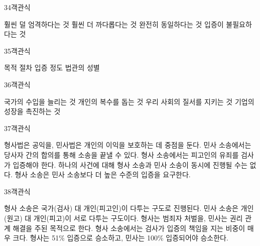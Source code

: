 \documentclass[fs9,seriesRus]{korfarm-base}
\begin{document}
\begin{kfQBlock}{34}{객관식}
\begin{kfChoices}
\kfChoice 훨씬 덜 엄격하다는 것
\kfChoice 훨씬 더 까다롭다는 것
\kfChoice 완전히 동일하다는 것
\kfChoice 입증이 불필요하다는 것
\end{kfChoices}
\end{kfQBlock}
\begin{kfQBlock}{35}{객관식}
\begin{kfChoices}
\kfChoice 목적
\kfChoice 절차
\kfChoice 입증 정도
\kfChoice 법관의 성별
\end{kfChoices}
\end{kfQBlock}
\begin{kfQBlock}{36}{객관식}
\begin{kfChoices}
\kfChoice 국가의 수입을 늘리는 것
\kfChoice 개인의 복수를 돕는 것
\kfChoice 우리 사회의 질서를 지키는 것
\kfChoice 기업의 성장을 촉진하는 것
\end{kfChoices}
\end{kfQBlock}
\begin{kfQBlock}{37}{객관식}
\begin{kfChoices}
\kfChoice 형사법은 공익을, 민사법은 개인의 이익을 보호하는 데 중점을 둔다.
\kfChoice 민사 소송에서는 당사자 간의 합의를 통해 소송을 끝낼 수 있다.
\kfChoice 형사 소송에서는 피고인의 유죄를 검사가 입증해야 한다.
\kfChoice 하나의 사건에 대해 형사 소송과 민사 소송이 동시에 진행될 수는 없다.
\kfChoice 형사 소송은 민사 소송보다 더 높은 수준의 입증을 요구한다.
\end{kfChoices}
\end{kfQBlock}
\begin{kfQBlock}{38}{객관식}
\begin{kfChoices}
\kfChoice 형사 소송은 국가(검사) 대 개인(피고인)이 다투는 구도로 진행된다.
\kfChoice 민사 소송은 개인(원고) 대 개인(피고)이 서로 다투는 구도이다.
\kfChoice 형사는 범죄자 처벌을, 민사는 권리 관계 해결을 주된 목적으로 한다.
\kfChoice 형사 소송에서는 검사가 입증의 책임을 지는 비중이 매우 크다.
\kfChoice 형사는 51\% 입증으로 승소하고, 민사는 100\% 입증되어야 승소한다.
\end{kfChoices}
\end{kfQBlock}
\end{document}

